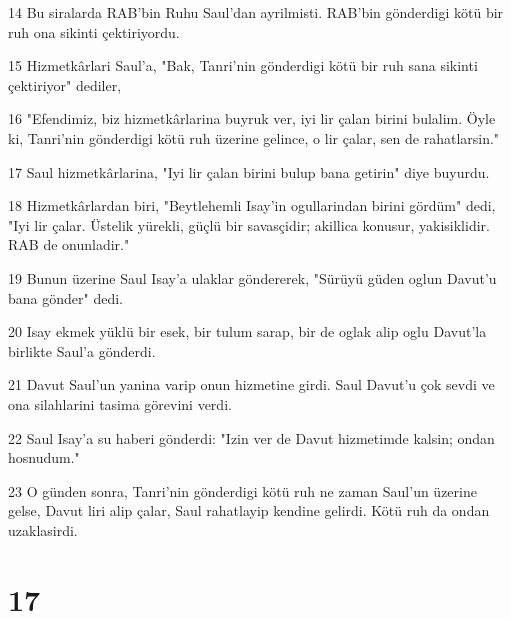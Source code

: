 \par 14 Bu siralarda RAB'bin Ruhu Saul'dan ayrilmisti. RAB'bin gönderdigi kötü bir ruh ona sikinti çektiriyordu.
\par 15 Hizmetkârlari Saul'a, "Bak, Tanri'nin gönderdigi kötü bir ruh sana sikinti çektiriyor" dediler,
\par 16 "Efendimiz, biz hizmetkârlarina buyruk ver, iyi lir çalan birini bulalim. Öyle ki, Tanri'nin gönderdigi kötü ruh üzerine gelince, o lir çalar, sen de rahatlarsin."
\par 17 Saul hizmetkârlarina, "Iyi lir çalan birini bulup bana getirin" diye buyurdu.
\par 18 Hizmetkârlardan biri, "Beytlehemli Isay'in ogullarindan birini gördüm" dedi, "Iyi lir çalar. Üstelik yürekli, güçlü bir savasçidir; akillica konusur, yakisiklidir. RAB de onunladir."
\par 19 Bunun üzerine Saul Isay'a ulaklar göndererek, "Sürüyü güden oglun Davut'u bana gönder" dedi.
\par 20 Isay ekmek yüklü bir esek, bir tulum sarap, bir de oglak alip oglu Davut'la birlikte Saul'a gönderdi.
\par 21 Davut Saul'un yanina varip onun hizmetine girdi. Saul Davut'u çok sevdi ve ona silahlarini tasima görevini verdi.
\par 22 Saul Isay'a su haberi gönderdi: "Izin ver de Davut hizmetimde kalsin; ondan hosnudum."
\par 23 O günden sonra, Tanri'nin gönderdigi kötü ruh ne zaman Saul'un üzerine gelse, Davut liri alip çalar, Saul rahatlayip kendine gelirdi. Kötü ruh da ondan uzaklasirdi.

\chapter{17}

